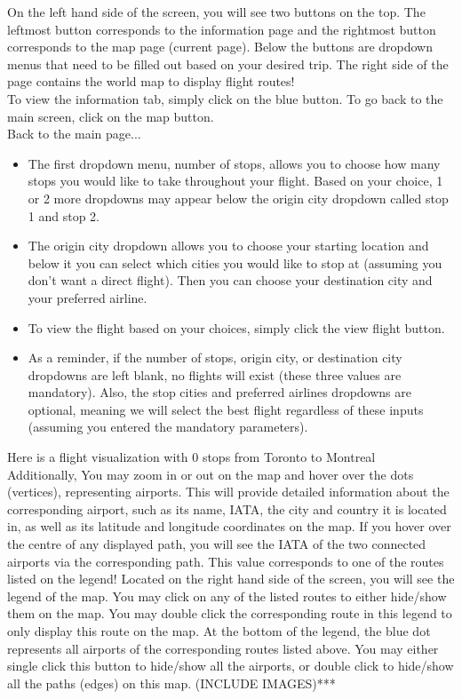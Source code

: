 \documentclass[fontsize=11pt]{article}
\begin{document}
On the left hand side of the screen, you will see two buttons on the top. The leftmost button corresponds to the information page and the rightmost button corresponds to the map page (current page). Below the buttons are dropdown menus that need to be filled out based on your desired trip. The right side of the page contains the world map to display flight routes! \\

To view the information tab, simply click on the blue button. To go back to the main screen, click on the map button. \\


Back to the main page... \\
\begin{itemize}
  \item The first dropdown menu, number of stops, allows you to choose how many stops you would like to take throughout your flight. Based on your choice, 1 or 2 more dropdowns may appear below the origin city dropdown called stop 1 and stop 2.
  \item The origin city dropdown allows you to choose your starting location and below it you can select which cities you would like to stop at (assuming you don’t want a direct flight). Then you can choose your destination city and your preferred airline.
  \item To view the flight based on your choices, simply click the view flight button.
  \item As a reminder, if the number of stops, origin city, or destination city dropdowns are left blank, no flights will exist (these three values are mandatory). Also, the stop cities and preferred airlines dropdowns are optional, meaning we will select the best flight regardless of these inputs (assuming you entered the mandatory parameters).
\end{itemize}
 
Here is a flight visualization with 0 stops from Toronto to Montreal \\


Additionally,
You may zoom in or out on the map and hover over the dots (vertices), representing airports. This will provide detailed information about the corresponding airport, such as its name, IATA, the city and country it is located in, as well as its latitude and longitude coordinates on the map.
If you hover over the centre of any displayed path, you will see the IATA of the two connected airports via the corresponding path. This value corresponds to one of the routes listed on the legend!
Located on the right hand side of the screen, you will see the legend of the map. You may click on any of the listed routes to either hide/show them on the map. You may double click the corresponding route in this legend to only display this route on the map. At the bottom of the legend, the blue dot represents all airports of the corresponding routes listed above. You may either single click this button to hide/show all the airports, or double click to hide/show all the paths (edges) on this map. (INCLUDE IMAGES)*** \\
\end{document}
